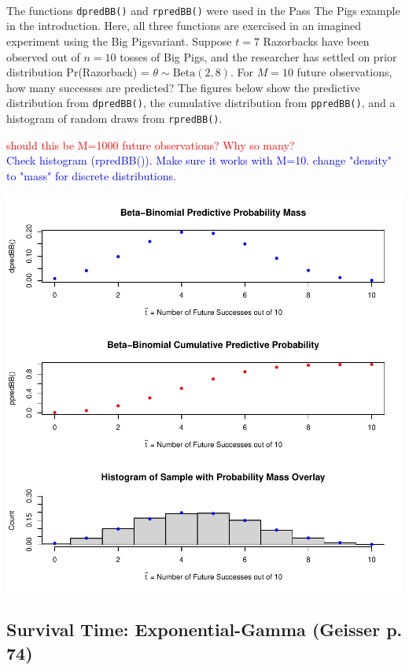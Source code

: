 \documentclass[12pt, a4paper]{article}
\begin{document}
The functions \texttt{dpredBB()} and \texttt{rpredBB()} were used in the Pass The Pigs\textsuperscript{\circledR} example in the introduction.  Here, all three functions are exercised in an imagined experiment using the Big Pigs\texttrademark variant.  Suppose $t=7$ Razorbacks have been observed out of $n=10$ tosses of Big Pigs\texttrademark, and the researcher has settled on prior distribution Pr(Razorback) = $\theta\sim\text{Beta}(2,8)$.  For $M = 10$ future observations, how many successes are predicted?  The figures below show the predictive distribution from \texttt{dpredBB()}, the cumulative distribution from \texttt{ppredBB()}, and a histogram of random draws from \texttt{rpredBB()}.


\textcolor{red}{should this be M=1000 future observations?  Why so many?}\\
\textcolor{blue}{Check histogram (rpredBB()).  Make sure it works with M=10.}
\textcolor{blue}{change "density" to "mass" for discrete distributions.}

\includegraphics{Thesis_v4-003}



    \subsection{Survival Time:  Exponential-Gamma (Geisser p. 74)}
\end{document}
